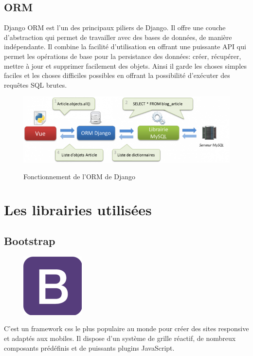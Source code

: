 \subsection{ORM}
Django ORM est l'un des principaux piliers de Django. Il offre une couche 
d'abstraction qui permet de travailler avec des bases de données, de manière 
indépendante. Il combine la facilité d'utilisation en offrant une puissante API 
qui permet les opérations de base pour la persistance des données: créer, 
récupérer, mettre à jour et supprimer facilement des objets. Ainsi il garde les 
choses simples faciles et les choses difficiles possibles en offrant la 
possibilité d’exécuter des requêtes SQL brutes\cite{48}.
        
        
\begin{figure}[h!]
    \centering
    \includegraphics[scale=0.8 ]{images/ORM.png}
    \label{fig77}
    \caption{Fonctionnement de l'ORM de Django}
    \label{}
\end{figure}
\clearpage       

\section{Les librairies utilisées}
\subsection{Bootstrap}
    \begin{figure}
        \vspace{-22pt}
        \begin{center}
            \includegraphics[scale=0.36]{images/logo/bootstrap.png}
            \label{fig78}
        \end{center}
        \vspace{-20pt}
        \vspace{-10pt}
    \end{figure}
C’est un framework css le plus populaire au monde pour créer des sites 
responsive et adaptés aux mobiles. Il dispose d’un système de grille réactif, 
de nombreux composants prédéfinis et de puissants plugins JavaScript\cite{22}.
        
